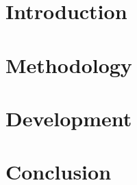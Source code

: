 \documentclass[journal]{IEEEtran}
\begin{document}


\maketitle

%   


%
\IEEEpeerreviewmaketitle{}

\section{Introduction}


\section{Methodology}


\section{Development}


\clearpage
\balance
\section{Conclusion}

\end{document}
